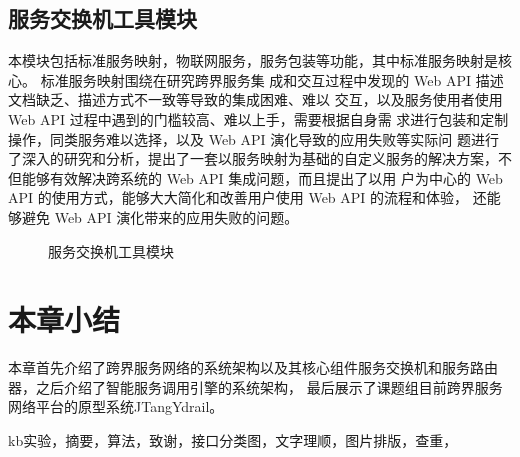   \subsection{服务交换机工具模块}
  本模块包括标准服务映射，物联网服务，服务包装等功能，其中标准服务映射是核心。
  标准服务映射围绕在研究跨界服务集
  成和交互过程中发现的 Web API 描述文档缺乏、描述方式不一致等导致的集成困难、难以
  交互，以及服务使用者使用 Web API 过程中遇到的门槛较高、难以上手，需要根据自身需
  求进行包装和定制操作，同类服务难以选择，以及 Web API 演化导致的应用失败等实际问
  题进行了深入的研究和分析，提出了一套以服务映射为基础的自定义服务的解决方案，不但能够有效解决跨系统的 Web API 集成问题，而且提出了以用
  户为中心的 Web API 的使用方式，能够大大简化和改善用户使用 Web API 的流程和体验，
还能够避免 Web API 演化带来的应用失败的问题。
  \begin{figure}[htbp]
    \caption{服务交换机工具模块}
    \label{fig:fuwugongju}
    \end{figure}
\section{本章小结}
本章首先介绍了跨界服务网络的系统架构以及其核心组件服务交换机和服务路由器，之后介绍了智能服务调用引擎的系统架构，
最后展示了课题组目前跨界服务网络平台的原型系统JTangYdrail。

kb实验，摘要，算法，致谢，接口分类图，文字理顺，图片排版，查重，